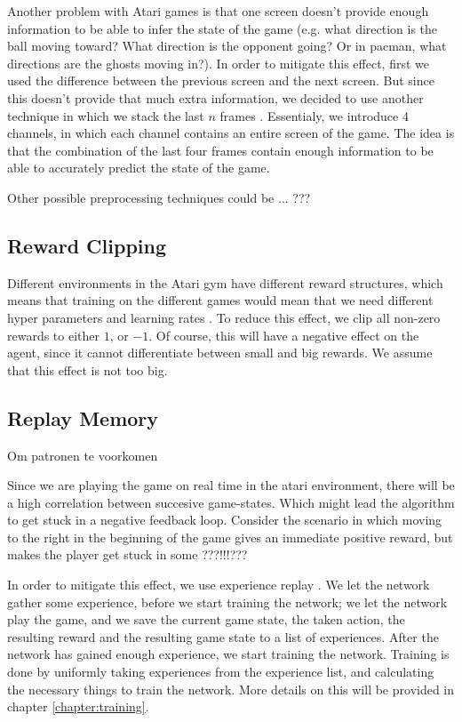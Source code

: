\documentclass{article}
\begin{document}
Another problem with Atari games is that one screen doesn't provide enough information to be able to infer the state of the game (e.g. what direction is the ball moving toward? What direction is the opponent going? Or in pacman, what directions are the ghosts moving in?). In order to mitigate this effect, first we used the difference between the previous screen and the next screen. But since this doesn't provide that much extra information, we decided to use another technique in which we stack the last $n$ frames \cite{mnih2013playing}. Essentialy, we introduce 4 channels, in which each channel contains an entire screen of the game. The idea is that the combination of the last four frames contain enough information to be able to accurately predict the state of the game.

Other possible preprocessing techniques could be ... ???

\subsection{Reward Clipping}

Different environments in the Atari gym have different reward structures, which means that training on the different games would mean that we need different hyper parameters and learning rates . To reduce this effect, we clip all non-zero rewards to either $1$, or $-1$. Of course, this will have a negative effect on the agent, since it cannot differentiate between small and big rewards. We assume that this effect is not too big\cite{mnih2015human}.


\subsection{Replay Memory}
Om patronen te voorkomen \cite{mnih2013playing}

Since we are playing the game on real time in the atari environment, there will be a high correlation between succesive game-states. Which might lead the algorithm to get stuck in a negative feedback loop. Consider the scenario in which moving to the right in the beginning of the game gives an immediate positive reward, but makes the player get stuck in some ???!!!???

In order to mitigate this effect, we use experience replay \cite{mnih2013playing}. We let the network gather some experience, before we start training the network; we let the network play the game, and we save the current game state, the taken action, the resulting reward and the resulting game state to a list of experiences. After the network has gained enough experience, we start training the network. Training is done by uniformly taking experiences from the experience list, and calculating the necessary things to train the network. More details on this will be provided in  chapter \ref{chapter:training}.
\end{document}

